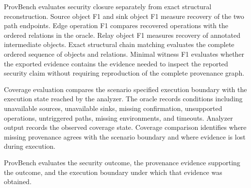 ProvBench evaluates security closure separately from exact structural
reconstruction. Source object F1 and sink object F1 measure recovery of the two
path endpoints. Edge operation F1 compares recovered operations with the
ordered relations in the oracle. Relay object F1 measures recovery of
annotated intermediate objects. Exact structural chain matching evaluates the
complete ordered sequence of objects and relations. Minimal witness F1
evaluates whether the exported evidence contains the evidence needed to inspect
the reported security claim without requiring reproduction of the complete
provenance graph.

Coverage evaluation compares the scenario specified execution boundary with
the execution state reached by the analyzer. The oracle records conditions
including unavailable sources, unavailable sinks, missing confirmation,
unsupported operations, untriggered paths, missing environments, and timeouts.
Analyzer output records the observed coverage state. Coverage comparison
identifies where missing provenance agrees with the scenario boundary and
where evidence is lost during execution.

ProvBench evaluates the security outcome, the provenance evidence supporting
the outcome, and the execution boundary under which that evidence was
obtained.
